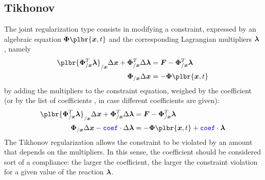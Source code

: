 \subsection{Tikhonov}
The  joint regularization type consists in modifying
a constraint, expressed by an algebraic equation $\T{\Phi}\plbr{\T{x}, t}$
and the corresponding Lagrangian multipliers $\boldsymbol{\lambda}$, namely
\begin{align}
	\plbr{\T{\Phi}_{/\T{x}}^T \T{\lambda}}_{/\T{x}} \Delta\T{x}
	+ \T{\Phi}_{/\T{x}}^T \Delta\T{\lambda}
		&= \T{F} - \T{\Phi}_{/\T{x}}^T \T{\lambda} \\
	\T{\Phi}_{/\T{x}} \Delta\T{x} &= - \T{\Phi}\plbr{\T{x}, t}
\end{align}
by adding the multipliers to the constraint equation,
weighed by the coefficient  (or by the list of coefficients
, in case different coefficients are given):
\begin{align}
	\plbr{\T{\Phi}_{/\T{x}}^T \T{\lambda}}_{/\T{x}} \Delta\T{x}
	+ \T{\Phi}_{/\T{x}}^T \Delta\T{\lambda}
	&= \T{F} - \T{\Phi}_{/\T{x}}^T \T{\lambda} \\
	\T{\Phi}_{/\T{x}} \Delta\T{x}
	- \nt{coef} \cdot \Delta\T{\lambda}
	&= - \T{\Phi}\plbr{\T{x}, t} + \nt{coef} \cdot \T{\lambda}
\end{align}
The Tikhonov regularization allows the constraint to be violated
by an amount that depends on the multipliers.
In this sense, the coefficient  should be considered
sort of a compliance: the larger the coefficient,
the larger the constraint violation for a given value
of the reaction $\boldsymbol{\lambda}$.

